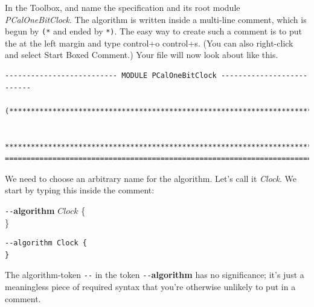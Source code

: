 In the Toolbox,  and name the
specification and its root module \emph{PCalOneBitClock}.  The
algorithm is written inside a 
multi-line comment, which is begun by
\verb|(*| and ended by \verb|*)|.  The easy way to create such a
comment is to put the 
   at the left margin and type
\textsf{control+o} \textsf{control+s}.  (You can also right-click and
select \textsf{Start Boxed Comment}.)  Your file will now look about
like this.
\begin{verbatim}
-------------------------- MODULE PCalOneBitClock --------------------------

(***************************************************************************

 ***************************************************************************)
=============================================================================
\end{verbatim}
We need to choose an arbitrary name for the algorithm.  Let's call it
\emph{Clock}.  We start by typing this inside the
   comment:%
\begin{display}
\begin{twocols}
\verb|--|\textbf{algorithm} $Clock$ \{\\
\}
\midcol
\begin{verbatim}
--algorithm Clock {
}
\end{verbatim}
\end{twocols}
\end{display}
The 
  {algorithm-token}%
\verb|--| in the token \verb|--|\textbf{algorithm} has no
significance; it's just a meaningless piece of required syntax that
you're otherwise unlikely to put in a comment.


